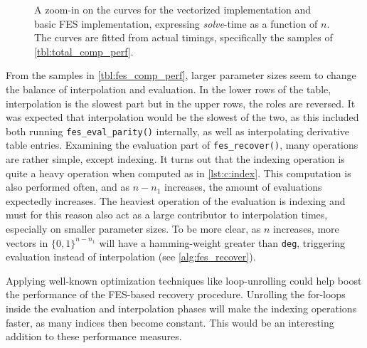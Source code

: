 \begin{figure}[t]
    \centering
    \caption{A zoom-in on the curves for the vectorized implementation and basic FES implementation, expressing \textit{solve}-time as a function of $n$. The curves are fitted from actual timings, specifically the samples of \cref{tbl:total_comp_perf}.} \label{fig:time_avx_fes}
\end{figure}
From the samples in \cref{tbl:fes_comp_perf}, larger parameter sizes seem to change the balance of interpolation and evaluation. In the lower rows of the table, interpolation is the slowest part but in the upper rows, the roles are reversed. It was expected that interpolation would be the slowest of the two, as this included both running \texttt{fes\_eval\_parity()} internally, as well as interpolating derivative table entries. Examining the evaluation part of \texttt{fes\_recover()}, many operations are rather simple, except indexing. It turns out that the indexing operation is quite a heavy operation when computed as in \cref{lst:c:index}. This computation is also performed often, and as $n - n_1$ increases, the amount of evaluations expectedly increases. The heaviest operation of the evaluation is indexing and must for this reason also act as a large contributor to interpolation times, especially on smaller parameter sizes. To be more clear, as $n$ increases, more vectors in $\{0,1\}^{n - n_1}$ will have a hamming-weight greater than \texttt{deg}, triggering evaluation instead of interpolation (see \cref{alg:fes_recover}).

Applying well-known optimization techniques like loop-unrolling could help boost the performance of the FES-based recovery procedure. Unrolling the for-loops inside the evaluation and interpolation phases will make the indexing operations faster, as many indices then become constant. This would be an interesting addition to these performance measures.

